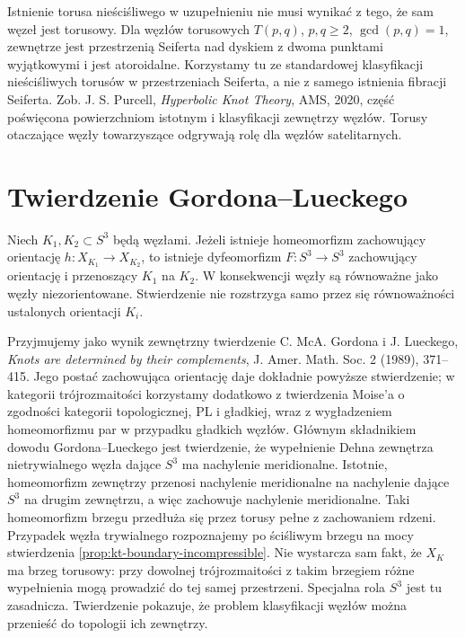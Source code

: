 \begin{uwaga}
Istnienie torusa nieściśliwego w uzupełnieniu nie musi
wynikać z tego, że sam węzeł jest torusowy. Dla węzłów
torusowych $T(p,q)$, $p,q\geq2$, $\gcd(p,q)=1$,
zewnętrze jest przestrzenią Seiferta nad dyskiem
z dwoma punktami wyjątkowymi i jest atoroidalne.
Korzystamy tu ze standardowej klasyfikacji
nieściśliwych torusów w przestrzeniach Seiferta,
a nie z samego istnienia fibracji Seiferta.
Zob. J. S. Purcell, \emph{Hyperbolic Knot Theory},
AMS, 2020, część poświęcona powierzchniom istotnym
i klasyfikacji zewnętrzy węzłów. Torusy otaczające
węzły towarzyszące odgrywają rolę dla węzłów satelitarnych.
\end{uwaga}

\section{Twierdzenie Gordona--Lueckego}
\label{sec:kt-gl}

\begin{twierdzenie}
Niech $K_1,K_2\subset S^3$ będą węzłami. Jeżeli istnieje
homeomorfizm zachowujący orientację
$h\colon X_{K_1}\to X_{K_2}$, to istnieje dyfeomorfizm
$F\colon S^3\to S^3$ zachowujący orientację i przenoszący
$K_1$ na $K_2$. W konsekwencji węzły są równoważne
jako węzły niezorientowane. Stwierdzenie nie rozstrzyga
samo przez się równoważności ustalonych orientacji $K_i$.
\end{twierdzenie}

\begin{uwaga}
Przyjmujemy jako wynik zewnętrzny twierdzenie
C. McA. Gordona i J. Lueckego,
\emph{Knots are determined by their complements},
J. Amer. Math. Soc. 2 (1989), 371--415.
Jego postać zachowująca orientację daje dokładnie
powyższe stwierdzenie; w kategorii trójrozmaitości
korzystamy dodatkowo z twierdzenia Moise'a o zgodności
kategorii topologicznej, PL i gładkiej, wraz z
wygładzeniem homeomorfizmu par w przypadku gładkich
węzłów. Głównym składnikiem dowodu Gordona--Lueckego
jest twierdzenie, że wypełnienie Dehna zewnętrza
nietrywialnego węzła dające $S^3$ ma nachylenie
meridionalne. Istotnie, homeomorfizm zewnętrzy
przenosi nachylenie meridionalne na nachylenie
dające $S^3$ na drugim zewnętrzu, a więc zachowuje
nachylenie meridionalne. Taki homeomorfizm brzegu
przedłuża się przez torusy pełne z zachowaniem
rdzeni. Przypadek węzła trywialnego rozpoznajemy
po ściśliwym brzegu na mocy stwierdzenia
\ref{prop:kt-boundary-incompressible}.
Nie wystarcza sam fakt, że $X_K$ ma brzeg torusowy:
przy dowolnej trójrozmaitości z takim brzegiem różne
wypełnienia mogą prowadzić do tej samej przestrzeni.
Specjalna rola $S^3$ jest tu zasadnicza. Twierdzenie
pokazuje, że problem klasyfikacji węzłów można przenieść
do topologii ich zewnętrzy.
\end{uwaga}

